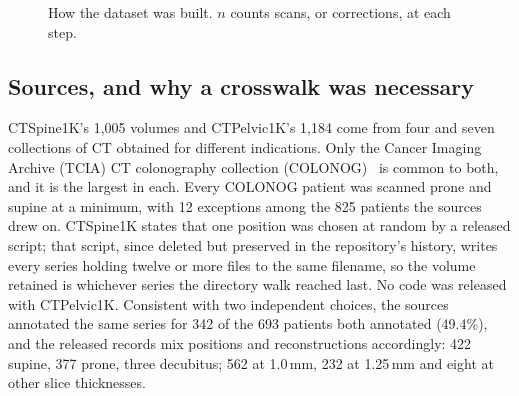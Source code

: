 \documentclass[aapm,mph,amsmath,amssymb,reprint]{revtex4-2}
\begin{document}
\begin{figure}[t]
\caption{How the dataset was built. $n$ counts scans, or corrections, at each step.}
\label{fig:pipeline}
\end{figure}

\subsection{Sources, and why a crosswalk was necessary}\label{sec:sources}
CTSpine1K's 1{,}005 volumes and CTPelvic1K's 1{,}184 come from four and seven collections of
CT obtained for different indications. Only the Cancer Imaging Archive (TCIA) CT colonography
collection (COLONOG)~\cite{colonog,tcia} is common to both, and it is the largest in each.
Every COLONOG patient was scanned prone and supine at a minimum, with 12
exceptions among the 825 patients the sources drew on. CTSpine1K states that one position was
chosen at random by a released script; that script, since deleted but preserved in the
repository's history, writes every series holding twelve or more files to the same filename,
so the volume retained is whichever series the directory walk reached last. No code was
released with CTPelvic1K. Consistent with two independent choices, the sources annotated the
same series for 342 of the 693 patients both annotated (49.4\%), and the released records mix
positions and reconstructions accordingly: 422 supine, 377 prone, three decubitus; 562 at
1.0\,mm, 232 at 1.25\,mm and eight at other slice thicknesses.
\end{document}
